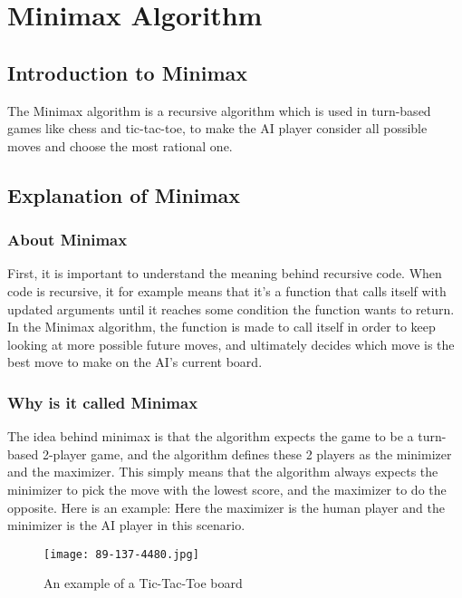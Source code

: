 \section{Minimax Algorithm} 
\label{sec:Minimax Algorithm}

\subsection{Introduction to Minimax}
\label{subsec:Introduction to Minimax}
The Minimax algorithm is a recursive algorithm which is used in turn-based games like chess and tic-tac-toe, 
to make the AI player consider all possible moves and choose the most rational one.

\subsection{Explanation of Minimax}
\label{subsec:Explanation of Minimax}
\subsubsection{About Minimax}
First, it is important to understand the meaning behind recursive code. 
When code is recursive, it for example means that it's a function that calls itself with updated arguments until it reaches some condition the function wants to return. 
In the Minimax algorithm, the function is made to call itself in order to keep looking at more possible future moves, 
and ultimately decides which move is the best move to make on the AI’s current board.
\subsubsection{Why is it called Minimax}
The idea behind minimax is that the algorithm expects the game to be a turn-based 2-player game, and the algorithm defines these 2 players as the minimizer and the maximizer. 
This simply means that the algorithm always expects the minimizer to pick the move with the lowest score, and the maximizer to do the opposite. 
Here is an example: Here the maximizer is the human player and the minimizer is the AI player in this scenario.\\

\begin{figure}
    \caption{An example of a Tic-Tac-Toe board}
    \texttt{[image: 89-137-4480.jpg]}
    \label{fig:Board Example}
\end{figure}

